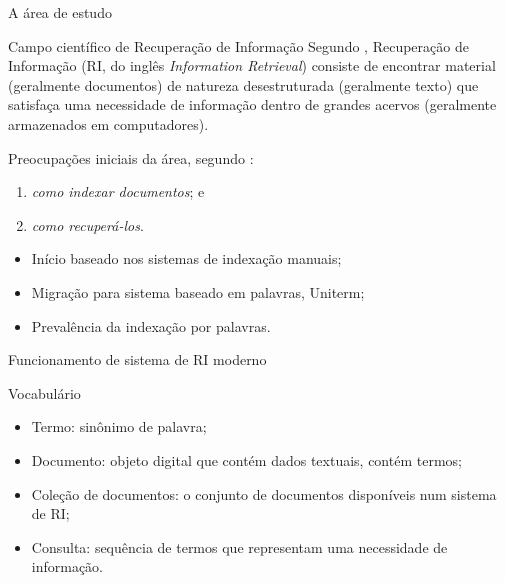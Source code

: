 \documentclass[%
  10pt,%
  aspectratio = 169,%
  compress,%
  t,%
]{beamer}%
\begin{document}
    \begin{frame}{}{A área de estudo}    
        \begin{block}{Campo científico de Recuperação de Informação}
            Segundo \cite[p.~1]{Manning2008IIR}, Recuperação de Informação (RI, do inglês \textit{Information Retrieval}) consiste de encontrar material (geralmente documentos) de natureza desestruturada (geralmente texto) que satisfaça uma necessidade de informação dentro de grandes acervos (geralmente armazenados em computadores).
            \par
            Preocupações iniciais da área, segundo \cite[p.~3]{Sanderson2012THIRR}:
            \begin{enumerate}%
                \item \textit{como indexar documentos}; e 
                \item \textit{como recuperá-los}.
            \end{enumerate}
        \end{block}
        \begin{itemize}
            \item Início baseado nos sistemas de indexação manuais;
            \item Migração para sistema baseado em palavras, Uniterm;
            \item Prevalência da indexação por palavras.
        \end{itemize}
        
        
    \end{frame}
     
    \begin{frame}[fragile = singleslide]{}{Funcionamento de sistema de RI moderno}%
    \end{frame}
    
    \begin{frame}[fragile = singleslide]{}{Vocabulário}
        \begin{itemize}
            \item Termo: sinônimo de palavra;
            \item Documento: objeto digital que contém dados textuais, contém termos;
            \item Coleção de documentos: o conjunto de documentos disponíveis num sistema de RI;
            \item Consulta: sequência de termos que representam uma necessidade de informação.
        \end{itemize}
    \end{frame}
    
\end{document}
